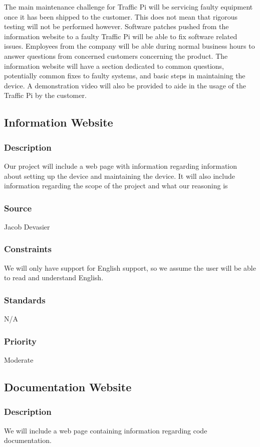 The main maintenance challenge for Traffic Pi will be servicing faulty equipment once it has been shipped to the customer. This does not mean that rigorous testing will not be performed however. Software patches pushed from the information website to a faulty Traffic Pi will be able to fix software related issues. Employees from the company will be able during normal business hours to answer questions from concerned customers concerning the product. The information website will have a section dedicated to common questions, potentially common fixes to faulty systems, and basic steps in maintaining the device. A demonstration video will also be provided to aide in the usage of the Traffic Pi by the customer.

\subsection{Information Website}
\subsubsection{Description}
Our project will include a web page with information regarding information about setting up the device and maintaining the device. It will also include information regarding the scope of the project and what our reasoning is
\subsubsection{Source}
Jacob Devasier
\subsubsection{Constraints}
We will only have support for English support, so we assume the user will be able to read and understand English.
\subsubsection{Standards}
N/A
\subsubsection{Priority}
Moderate

\subsection{Documentation Website}
\subsubsection{Description}
We will include a web page containing information regarding code documentation.
